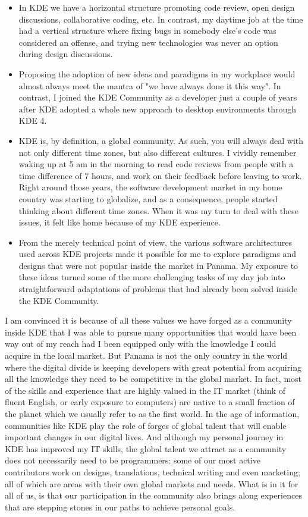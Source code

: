 \begin{itemize}
\item In KDE we have a horizontal structure promoting code review,
  open design discussions, collaborative coding, etc. In contrast, my
  daytime job at the time had a vertical structure where fixing bugs
  in somebody else's code was considered an offense, and trying new
  technologies was never an option during design discussions.
\item Proposing the adoption of new ideas and paradigms in my
  workplace would almost always meet the mantra of "we have always
  done it this way". In contrast, I joined the KDE Community as a
  developer just a couple of years after KDE adopted a whole new
  approach to desktop environments through KDE 4.
\item KDE is, by definition, a global community. As such, you will
  always deal with not only different time zones, but also different
  cultures. I vividly remember waking up at 5 am in the morning to
  read code reviews from people with a time difference of 7 hours, and work on
  their feedback before leaving to work. Right around those years, the
  software development market in my home country was starting to
  globalize, and as a consequence, people started thinking about
  different time zones. When it was my turn to deal with these issues,
  it felt like home because of my KDE experience.
\item From the merely technical point of view, the various software
  architectures used across KDE projects made it possible for me to
  explore paradigms and designs that were not popular inside the
  market in Panama. My exposure to these ideas turned some of the more
  challenging tasks of my day job into straightforward adaptations of
  problems that had already been solved inside the KDE Community.
\end{itemize}

I am convinced it is because of all these values we have forged
as a community inside KDE that I was able to pursue many opportunities
that would have been way out of my reach had I been equipped only with the
knowledge I could acquire in the local market. But Panama is not the
only country in the world where the digital divide is keeping
developers with great potential from acquiring all the knowledge they
need to be competitive in the global market. In fact, most of the
skills and experience that are highly valued in the IT market (think
of fluent English, or early exposure to computers) are native to a
small fraction of the planet which we usually refer to as the first
world. In the age of information, communities like KDE play the role
of forges of global talent that will enable important changes in our
digital lives. And although my personal journey in KDE has improved my
IT skills, the global talent we attract as a community does not
necessarily need to be programmers: some of our most active
contributors work on designs, translations, technical writing and even
marketing; all of which are areas with their own global markets and
needs. What is in it for all of us, is that our participation in the
community also brings along experiences that are stepping stones in
our paths to achieve personal goals.

